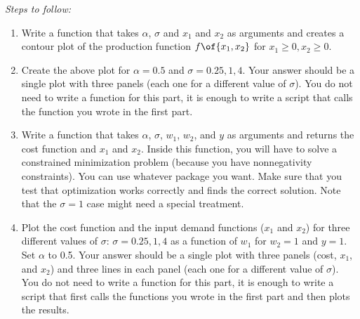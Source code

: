 \documentclass[english,hyperref={pdftex,pdfpagemode=UseNone,hidelinks}]{tufte-handout}
\begin{document}
\emph{Steps to follow:}
\begin{enumerate}
\item  Write a function that takes $\alpha$, $\sigma$ and $x_1$ and $x_2$ as arguments and creates a contour plot of the production function $f\of{x_1,x_2}$ for $x_1 \geq 0, x_2 \geq 0$. 
\item  Create the above plot for $\alpha = 0.5$ and $\sigma = 0.25, 1, 4$. Your answer should be a single plot with three panels (each one for a different value of $\sigma$). You do not need to write a function for this part, it is enough to write a script that calls the function you wrote in the first part.
\item  Write a function that takes $\alpha$, $\sigma$, $w_1$, $w_2$, and $y$ as arguments and returns the cost function and $x_1$ and $x_2$. Inside this function, you will have to solve a constrained minimization problem (because you have nonnegativity constraints). You can use whatever package you want. Make sure that you test that optimization works correctly and finds the correct solution. Note that the $\sigma=1$ case might need a special treatment.
\item  Plot the cost function and the input demand functions ($x_1$ and $x_2$) for three different values of $\sigma$: $\sigma = 0.25, 1, 4$ as a function of $w_1$ for $w_2 = 1$ and $y = 1$. Set $\alpha$ to 0.5. Your answer should be a single plot with three panels (cost, $x_1$, and $x_2$) and three lines in each panel (each one for a different value of $\sigma$). You do not need to write a function for this part, it is enough to write a script that first calls the functions you wrote in the first part and then plots the results.
\end{enumerate}
\end{document}
